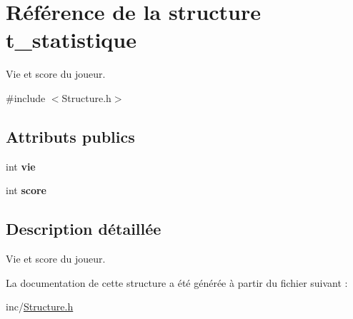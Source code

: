 \hypertarget{structt__statistique}{}\section{Référence de la structure t\+\_\+statistique}
\label{structt__statistique}


Vie et score du joueur.  




{\ttfamily \#include $<$Structure.\+h$>$}

\subsection*{Attributs publics}
\begin{DoxyCompactItemize}
\item 
\hypertarget{structt__statistique_aa643491d87ecf67a93abaeffef3319ec}{}int {\bfseries vie}\label{structt__statistique_aa643491d87ecf67a93abaeffef3319ec}

\item 
\hypertarget{structt__statistique_a986b3865e89ec81f6a64d53d0d07bb5a}{}int {\bfseries score}\label{structt__statistique_a986b3865e89ec81f6a64d53d0d07bb5a}

\end{DoxyCompactItemize}


\subsection{Description détaillée}
Vie et score du joueur. 

La documentation de cette structure a été générée à partir du fichier suivant \+:\begin{DoxyCompactItemize}
\item 
inc/\hyperlink{Structure_8h}{Structure.\+h}\end{DoxyCompactItemize}
